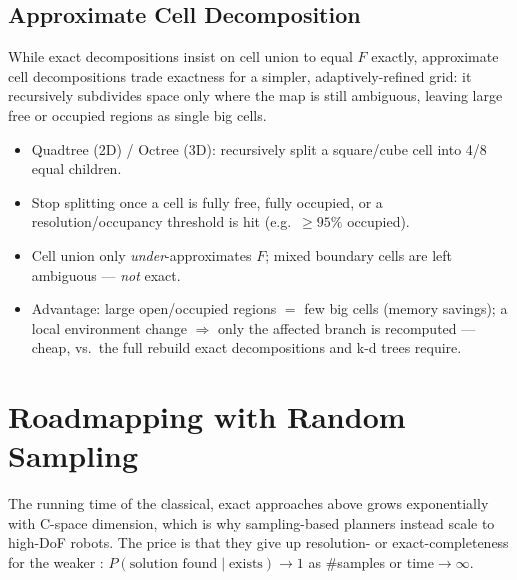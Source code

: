 \subsection{Approximate Cell Decomposition}
While exact decompositions insist on cell union to equal $F$ exactly, approximate cell decompositions trade exactness for a simpler, adaptively-refined grid: it recursively subdivides space only where the map is still ambiguous, leaving large free or occupied regions as single big cells.
\begin{itemize}
\item Quadtree (2D) / Octree (3D): recursively split a square/cube cell into 4/8 equal children.
\item Stop splitting once a cell is fully free, fully occupied, or a resolution/occupancy threshold is hit (e.g.\ $\ge95\%$ occupied).
\item Cell union only \emph{under}-approximates $F$; mixed boundary cells are left ambiguous — \emph{not} exact.
\item Advantage: large open/occupied regions $=$ few big cells (memory savings); a local environment change $\Rightarrow$ only the affected branch is recomputed — cheap, vs.\ the full rebuild exact decompositions and k-d trees require.
\end{itemize}


\begin{democallout}
\end{democallout}

\section{Roadmapping with Random Sampling}
The running time of the classical, exact approaches above grows exponentially with C-space dimension, which is why sampling-based planners instead scale to high-DoF robots. The price is that they give up resolution- or exact-completeness for the weaker : $P(\text{solution found}\mid\text{exists})\to1$ as \#samples or time$\to\infty$.

